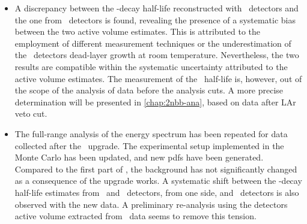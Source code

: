 \begin{itemize}
  \item A discrepancy between the \nnbb-decay half-life reconstructed with \bege\
    detectors and the one from \scoax\ detectors is found, revealing the presence of a
    systematic bias between the two active volume estimates. This is attributed to the
    employment of different measurement techniques or the underestimation of the \bege\
    detectors dead-layer growth at room temperature. Nevertheless, the two results are
    compatible within the systematic uncertainty attributed to the active volume
    estimates. The measurement of the \nnbb\ half-life is, however, out of the scope of
    the analysis of data before the analysis cuts. A more precise determination will be
    presented in \cref{chap:2nbb-ana}, based on data after LAr veto cut.
  \item The full-range analysis of the energy spectrum has been repeated for data
    collected after the \phasetwop\ upgrade. The experimental setup implemented in the
    Monte Carlo has been updated, and new pdfs have been generated. Compared to the first
    part of \phasetwo, the background has not significantly changed as a consequence of
    the upgrade works. A systematic shift between the \nnbb-decay half-life estimates from
    \scoax\ and \icoax\ detectors, from one side, and \bege\ detectors is also observed
    with the new data. A preliminary re-analysis using the detectors active volume
    extracted from \Arl\ data seems to remove this tension.
\end{itemize}

